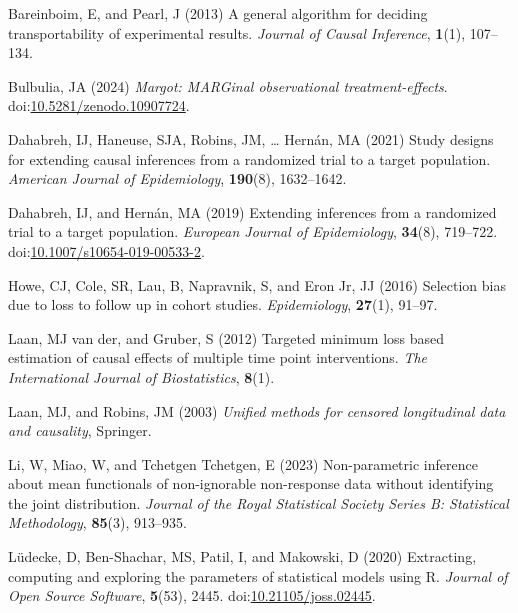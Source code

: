 \documentclass[
  singlecolumn]{article}
\newlength{\cslhangindent}
\newenvironment{CSLReferences}[2] %
 {\begin{list}{}{%
  \setlength{\itemindent}{0pt}
  \setlength{\leftmargin}{0pt}
  \setlength{\parsep}{0pt}
  \ifodd #1
   \setlength{\leftmargin}{\cslhangindent}
   \setlength{\itemindent}{-1\cslhangindent}
  \fi
  \setlength{\itemsep}{#2\baselineskip}}}
 {\end{list}}
\begin{document}
\label{refs}
\begin{CSLReferences}{1}{0}
Bareinboim, E, and Pearl, J (2013) A general algorithm for deciding
transportability of experimental results. \emph{Journal of Causal
Inference}, \textbf{1}(1), 107--134.

Bulbulia, JA (2024) \emph{Margot: MARGinal observational
treatment-effects}.
doi:\href{https://doi.org/10.5281/zenodo.10907724}{10.5281/zenodo.10907724}.

Dahabreh, IJ, Haneuse, SJA, Robins, JM, \ldots{} Hernán, MA (2021) Study
designs for extending causal inferences from a randomized trial to a
target population. \emph{American Journal of Epidemiology},
\textbf{190}(8), 1632--1642.

Dahabreh, IJ, and Hernán, MA (2019) Extending inferences from a
randomized trial to a target population. \emph{European Journal of
Epidemiology}, \textbf{34}(8), 719--722.
doi:\href{https://doi.org/10.1007/s10654-019-00533-2}{10.1007/s10654-019-00533-2}.

Howe, CJ, Cole, SR, Lau, B, Napravnik, S, and Eron Jr, JJ (2016)
Selection bias due to loss to follow up in cohort studies.
\emph{Epidemiology}, \textbf{27}(1), 91--97.

Laan, MJ van der, and Gruber, S (2012) Targeted minimum loss based
estimation of causal effects of multiple time point interventions.
\emph{The International Journal of Biostatistics}, \textbf{8}(1).

Laan, MJ, and Robins, JM (2003) \emph{Unified methods for censored
longitudinal data and causality}, Springer.

Li, W, Miao, W, and Tchetgen Tchetgen, E (2023) Non-parametric inference
about mean functionals of non-ignorable non-response data without
identifying the joint distribution. \emph{Journal of the Royal
Statistical Society Series B: Statistical Methodology}, \textbf{85}(3),
913--935.

Lüdecke, D, Ben-Shachar, MS, Patil, I, and Makowski, D (2020)
Extracting, computing and exploring the parameters of statistical models
using {R}. \emph{Journal of Open Source Software}, \textbf{5}(53), 2445.
doi:\href{https://doi.org/10.21105/joss.02445}{10.21105/joss.02445}.


\end{CSLReferences}
\end{document}
